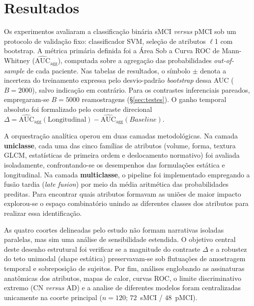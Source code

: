 \documentclass[review]{elsarticle}
\begin{document}
	\section{Resultados}\label{sec:Results}
	
	
	Os experimentos avaliaram a classificação binária sMCI \emph{versus} pMCI sob um protocolo de validação fixo: classificador SVM, seleção de atributos $\ell$1 com bootstrap. A métrica primária definida foi a Área Sob a Curva ROC de Mann-Whitney ($\widehat{\mathrm{AUC}}_{\mathrm{agg}}$), computada sobre a agregação das probabilidades \emph{out-of-sample} de cada paciente. Nas tabelas de resultados, o símbolo $\pm$ denota a incerteza do treinamento expressa pelo desvio-padrão \emph{bootstrap} dessa AUC ($B=2000$), salvo indicação em contrário. Para os contrastes inferenciais pareados, empregaram-se $B=5000$ reamostragens (\S\ref{sec:testes}). O ganho temporal absoluto foi formalizado pelo contraste direcional $\Delta = \widehat{\mathrm{AUC}}_{\mathrm{agg}}(\mathrm{Longitudinal}) - \widehat{\mathrm{AUC}}_{\mathrm{agg}}(Baseline)$.
	
	A orquestração analítica operou em duas camadas metodológicas. Na camada \textbf{uniclasse}, cada uma das cinco famílias de atributos (volume, forma, textura GLCM, estatísticas de primeira ordem e deslocamento normativo) foi avaliada isoladamente, confrontando-se os desempenhos das formulações estática e longitudinal. Na camada \textbf{multiclasse}, o pipeline foi implementado empregando a fusão tardia (\emph{late fusion}) por meio da média aritmética das probabilidades preditas. Para encontrar quais atributos formavam as uniões de maior impacto explorou-se o espaço combinatório unindo as diferentes classes dos atributos para realizar essa identificação.
	
	As quatro coortes delineadas pelo estudo não formam narrativas isoladas paralelas, mas sim uma análise de sensibilidade estendida. O objetivo central deste desenho estrutural foi verificar se a magnitude do contraste $\Delta$ e a robustez do teto unimodal (shape estática) preservavam-se sob flutuações de amostragem temporal e sobreposição de sujeitos. Por fim, análises englobando as assinaturas anatômicas dos atributos, mapas de calor, curvas ROC, o limite discriminativo extremo (CN \emph{versus} AD) e a analise de diferentes modelos foram centralizadas unicamente na coorte principal ($n=120$; $72$~sMCI / $48$~pMCI).
	
\end{document}
